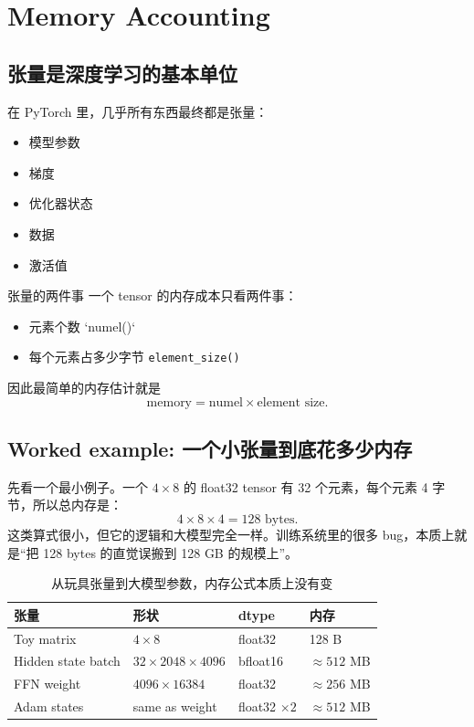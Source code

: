\documentclass[a4paper]{article}
\begin{document}
\section{Memory Accounting}

\subsection{张量是深度学习的基本单位}

在 PyTorch 里，几乎所有东西最终都是张量：
\begin{itemize}
    \item 模型参数
    \item 梯度
    \item 优化器状态
    \item 数据
    \item 激活值
\end{itemize}

\begin{knowledgebox}{张量的两件事}
一个 tensor 的内存成本只看两件事：
\begin{itemize}
    \item 元素个数 `numel()`
    \item 每个元素占多少字节 \texttt{element\_size()}
\end{itemize}
因此最简单的内存估计就是
\[
\text{memory} = \text{numel} \times \text{element size}.
\]
\end{knowledgebox}

\subsection{Worked example: 一个小张量到底花多少内存}

先看一个最小例子。一个 \(4\times 8\) 的 float32 tensor 有 32 个元素，每个元素 4 字节，所以总内存是：
\[
4 \times 8 \times 4 = 128 \text{ bytes}.
\]
这类算式很小，但它的逻辑和大模型完全一样。训练系统里的很多 bug，本质上就是“把 128 bytes 的直觉误搬到 128 GB 的规模上”。

\begin{table}[H]
\centering
\begin{tabular}{p{}p{}p{}p{}}
\toprule
\textbf{张量} & \textbf{形状} & \textbf{dtype} & \textbf{内存} \\
\midrule
Toy matrix & \(4\times 8\) & float32 & 128 B \\
Hidden state batch & \(32\times 2048\times 4096\) & bfloat16 & \(\approx 512\) MB \\
FFN weight & \(4096\times 16384\) & float32 & \(\approx 256\) MB \\
Adam states & same as weight & float32 \(\times 2\) & \(\approx 512\) MB \\
\bottomrule
\end{tabular}
\caption{从玩具张量到大模型参数，内存公式本质上没有变}
\end{table}
\end{document}
